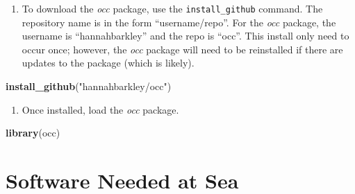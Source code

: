 \documentclass[]{book}
\newenvironment{Shaded}{\begin{snugshade}}{\end{snugshade}}
\newcommand{\KeywordTok}[1]{\textcolor[rgb]{0.13,0.29,0.53}{\textbf{#1}}}
\newcommand{\NormalTok}[1]{#1}
\newcommand{\StringTok}[1]{\textcolor[rgb]{0.31,0.60,0.02}{#1}}
\providecommand{\tightlist}{%
  \setlength{\itemsep}{0pt}\setlength{\parskip}{0pt}}
\begin{document}
\begin{enumerate}
\def\labelenumi{\arabic{enumi}.}
\setcounter{enumi}{1}
\tightlist
\item
  To download the \emph{occ} package, use the \texttt{install\_github} command. The repository name is in the form ``username/repo''. For the \emph{occ} package, the username is ``hannahbarkley'' and the repo is ``occ''. This install only need to occur once; however, the \emph{occ} package will need to be reinstalled if there are updates to the package (which is likely).
\end{enumerate}

\begin{Shaded}
\begin{Highlighting}[]
\KeywordTok{install_github}\NormalTok{(}\StringTok{"hannahbarkley/occ"}\NormalTok{)}
\end{Highlighting}
\end{Shaded}

\begin{enumerate}
\def\labelenumi{\arabic{enumi}.}
\setcounter{enumi}{2}
\tightlist
\item
  Once installed, load the \emph{occ} package.
\end{enumerate}

\begin{Shaded}
\begin{Highlighting}[]
\KeywordTok{library}\NormalTok{(occ)}
\end{Highlighting}
\end{Shaded}

\hypertarget{software-needed-at-sea-1}{%
\chapter{Software Needed at Sea}\label{software-needed-at-sea-1}}
\end{document}
